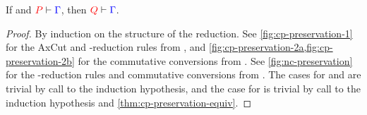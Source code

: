 \begin{theorem}[Preservation]\label{thm:nc-preservation}
  If  and $\seq[{ P }]{ \Gamma }$, then $\seq[{ Q }]{ \Gamma }$.
\end{theorem}
\begin{proof}
  By induction on the structure of the reduction. See
  \cref{fig:cp-preservation-1} for the AxCut and \textbeta-reduction rules from
  \cp, and \cref{fig:cp-preservation-2a,fig:cp-preservation-2b} for the
  commutative conversions from \cp.
  See \cref{fig:nc-preservation} for the \textbeta-reduction rules and
  commutative conversions from \nc.
  The cases for \cpRedGammaCut and \ncRedGammaPool are trivial by call to the
  induction hypothesis, and the case for \cpRedGammaEquiv is trivial by call to
  the induction hypothesis and \cref{thm:cp-preservation-equiv}.
\end{proof}
